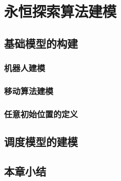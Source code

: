 ﻿\chapter{永恒探索算法建模}

\section{基础模型的构建}

\subsection{机器人建模}
\subsection{移动算法建模}
\subsection{任意初始位置的定义}

\section{调度模型的建模}

\section{本章小结}
